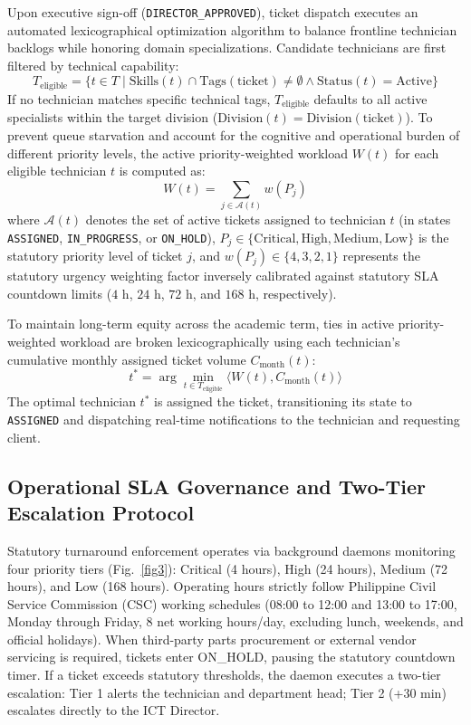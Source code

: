 \documentclass[conference]{IEEEtran}
\begin{document}
Upon executive sign-off (\texttt{DIRECTOR\_APPROVED}), ticket dispatch executes an automated lexicographical optimization algorithm to balance frontline technician backlogs while honoring domain specializations. Candidate technicians are first filtered by technical capability:
\begin{equation}
T_{\text{eligible}} = \{ t \in T \mid \text{Skills}(t) \cap \text{Tags}(\text{ticket}) \neq \emptyset \land \text{Status}(t) = \text{Active} \}
\end{equation}
If no technician matches specific technical tags, $T_{\text{eligible}}$ defaults to all active specialists within the target division ($\text{Division}(t) = \text{Division}(\text{ticket})$). To prevent queue starvation and account for the cognitive and operational burden of different priority levels, the active priority-weighted workload $W(t)$ for each eligible technician $t$ is computed as:
\begin{equation}
W(t) = \sum_{j \in \mathcal{A}(t)} w(P_j)
\end{equation}
where $\mathcal{A}(t)$ denotes the set of active tickets assigned to technician $t$ (in states \texttt{ASSIGNED}, \texttt{IN\_PROGRESS}, or \texttt{ON\_HOLD}), $P_j \in \{\text{Critical}, \text{High}, \text{Medium}, \text{Low}\}$ is the statutory priority level of ticket $j$, and $w(P_j) \in \{4, 3, 2, 1\}$ represents the statutory urgency weighting factor inversely calibrated against statutory SLA countdown limits ($4\text{ h}$, $24\text{ h}$, $72\text{ h}$, and $168\text{ h}$, respectively).

To maintain long-term equity across the academic term, ties in active priority-weighted workload are broken lexicographically using each technician's cumulative monthly assigned ticket volume $C_{\text{month}}(t)$:
\begin{equation}
t^* = \arg\min_{t \in T_{\text{eligible}}} \langle W(t), C_{\text{month}}(t) \rangle
\end{equation}
The optimal technician $t^*$ is assigned the ticket, transitioning its state to \texttt{ASSIGNED} and dispatching real-time notifications to the technician and requesting client.

\subsection{Operational SLA Governance and Two-Tier Escalation Protocol}
Statutory turnaround enforcement operates via background daemons monitoring four priority tiers (Fig.~\ref{fig3}): Critical (4 hours), High (24 hours), Medium (72 hours), and Low (168 hours). Operating hours strictly follow Philippine Civil Service Commission (CSC) working schedules (08:00 to 12:00 and 13:00 to 17:00, Monday through Friday, 8 net working hours/day, excluding lunch, weekends, and official holidays). When third-party parts procurement or external vendor servicing is required, tickets enter ON\_HOLD, pausing the statutory countdown timer. If a ticket exceeds statutory thresholds, the daemon executes a two-tier escalation: Tier 1 alerts the technician and department head; Tier 2 (+30 min) escalates directly to the ICT Director.
\end{document}
